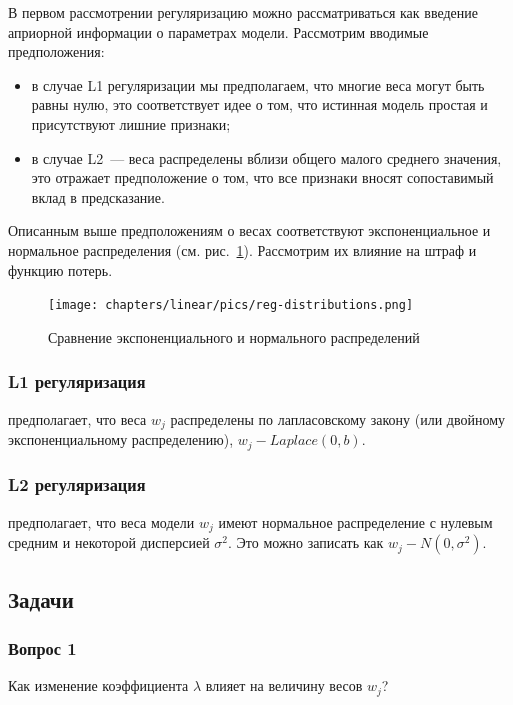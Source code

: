 В первом рассмотрении регуляризацию можно рассматриваться как введение априорной информации о параметрах модели. Рассмотрим вводимые предположения:
\begin{itemize}
	\item в случае L1 регуляризации мы предполагаем, что многие веса могут быть равны нулю, это соответствует идее о том, что истинная модель простая и присутствуют лишние признаки;
	\item в случае L2~--- веса распределены вблизи общего малого среднего значения, это отражает предположение о том, что все признаки вносят сопоставимый вклад в предсказание.
\end{itemize}
\noindent
Описанным выше предположениям о весах соответствуют экспоненциальное и нормальное распределения (см. рис.~\ref{linear-reg-distribution}). Рассмотрим их влияние на штраф и функцию потерь.

\begin{figure}[ht]
	\centering
	\texttt{[image: chapters/linear/pics/reg-distributions.png]}
	\caption{Сравнение экспоненциального и нормального распределений}
	\label{linear-reg-distribution}
\end{figure}

\subsubsection {L1 регуляризация}

предполагает, что веса $w_j$ распределены по лапласовскому закону (или двойному экспоненциальному распределению), $w_j - Laplace(0, b)$.

\subsubsection{L2 регуляризация}

предполагает, что веса модели $w_j$ имеют нормальное распределение с нулевым средним и некоторой дисперсией $\sigma^2$. Это можно записать как $w_j - N(0, \sigma^2)$.

\subsection {Задачи}
\label{linear-reg-task}


\subsubsection{Вопрос 1}
\noindent Как изменение коэффициента $\lambda$ влияет на величину весов $w_j$?

